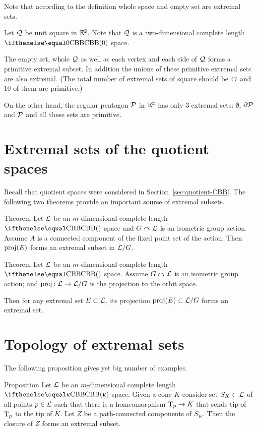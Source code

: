 Note that according to the definition whole space and empty set are extremal sets.

Let $\mathcal{Q}$ be unit square in $\mathbb{E}^2$.
Note that $\mathcal{Q}$ is a two-dimensional complete length $\Alex0$ space.

The empty set, 
whole $\mathcal{Q}$ as well as each vertex 
and each side of $\mathcal{Q}$ forms a primitive extremal subset.
In addition the unions of these primitive extremal sets are also extremal.
(The total number of extremal sets of square should be 47 and 10 of them are primitive.)

On the other hand, the regular pentagon $\mathcal{P}$ in $\mathbb{E}^2$
has only 3 extremal sets: $\emptyset$, $\partial\mathcal{P}$ and $\mathcal{P}$
and all these sets are primitive.

\section{Extremal sets of the quotient spaces}

Recall that quotient spaces 
were considered in Section~\ref{sec:quotient-CBB}.
The following two theorems provide an important sourse of extremal subsets.

\begin{thm}{Theorem}
Let $\mathcal{L}$ be an $m$-dimensional complete length $\Alex{}$ space
and $G\curvearrowright\mathcal{L}$ is an isometric group action.
Assume $A$ is a connected component of the fixed point set of the action.
Then $\mathop{\rm proj}\nolimits(E)$ forms an extremal subset in $\mathcal{L}/G$.
\end{thm}

\begin{thm}{Theorem}
Let $\mathcal{L}$ be an $m$-dimensional complete length $\Alex{}$ space.
Assume $G\curvearrowright\mathcal{L}$ is an isometric group action;
and $\proj\:\spc{L}\to \spc{L}/G$ is the projection to the orbit space.

Then for any extremal set
$E\subset \spc{L}$,
its projection $\proj(E)\subset \spc{L}/G$ forms an extremal set.

\end{thm}




\section{Topology of extremal sets}

The following proposition gives yet big number of examples.

\begin{thm}{Proposition}\label{prop:t-cone} 
Let $\mathcal{L}$ be an $m$-dimensional complete length $\Alex\kappa$ space.
Given a cone $K$ 
consider set $S_K\subset \spc{L}$ of all points 
$p\in \spc{L}$ such that there is a homeomorphism $\T_p\to K$ that sends tip of $\text{\rm T}_p$ to the tip of $K$.
Let $Z$ be a path-connected components of $S_K$.
Then the closure of $Z$ forms an extremal subset. %
\end{thm}

